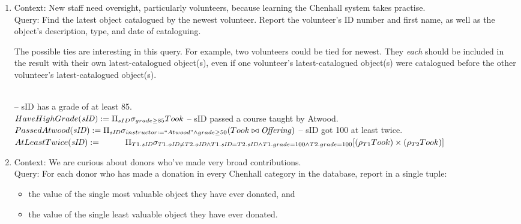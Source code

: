 \documentclass{article}
\newcommand{\var}[1]{\mathit{#1}}
\begin{document}
\begin{enumerate}
\item
Context: New staff need oversight, particularly volunteers,
because learning the Chenhall system takes practise. \\[5pt]
Query:
Find the latest object catalogued by the newest volunteer.
Report the volunteer's ID number and first name, as well as
the object's description, type, and date of cataloguing.

The possible ties are interesting in this query.
For example, two volunteers could be tied for newest.
They \textit{each} should be included in the result with their own latest-catalogued object(s),
even if one volunteer's latest-catalogued object(s) were catalogued before the other
volunteer's latest-catalogued object(s).

{~}\\ %
{\large %
-- sID has a grade of at least 85. \\[5pt]
$
HaveHighGrade(\var{sID}) := 
	\Pi_{sID} 
	\sigma_{grade \ge 85} 
	Took \\[10pt]
$
-- sID passed a course taught by Atwood. \\[5pt]
$
PassedAtwood(\var{sID}) := 
	\Pi_{\var{sID}} 
	\sigma_{instructor := ``Atwood" \wedge grade \ge 50} 
	(Took \bowtie \var{Offering}) 
	\\[10pt]
$
-- sID got 100 at least twice. \\[5pt]
$
AtLeastTwice(\var{sID}) := \\[5pt]  %
	\hspace*{1cm}  %
	\Pi_{T1.\var{sID}} 
	\sigma_{
		T1.\var{oID} \neq T2.\var{oID} \wedge 
		T1.\var{sID} = T2.\var{sID} \wedge 
		T1.grade = 100 \wedge T2.grade = 100}
	[ (\rho_{T1}Took) \times (\rho_{T2}Took) ] \\[5pt]
$
} %

\item
Context: We are curious about donors who've made very broad contributions. \\[5pt]
Query:
For each donor who has made a donation in every Chenhall category in the database,
report in a single tuple:
\begin{itemize}
\item the value of the single most valuable object they have ever donated, and
\item the value of  the single least valuable object they have ever donated.
\end{itemize}



\end{enumerate}
\end{document}
